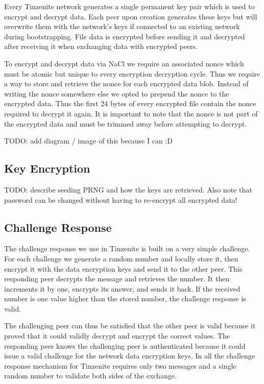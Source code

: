 Every Tinzenite network generates a single permanent key pair which is used to encrypt and decrypt data.
Each peer upon creation generates these keys but will overwrite them with the network's keys if connected to an existing network during bootstrapping.
File data is encrypted before sending it and decrypted after receiving it when exchanging data with encrypted peers.

To encrypt and decrypt data via NaCl we require an associated nonce which must be atomic but unique to every encryption decryption cycle.
Thus we require a way to store and retrieve the nonce for each encrypted data blob.
Instead of writing the nonce somewhere else we opted to prepend the nonce to the encrypted data. %
Thus the first 24 bytes of every encrypted file contain the nonce required to decrypt it again.
It is important to note that the nonce is not part of the encrypted data and must be trimmed away before attempting to decrypt.

TODO: add diagram / image of this because I can :D

\subsection{Key Encryption}
\label{sub:Key Encryption}

TODO: describe seeding PRNG and how the keys are retrieved.
Also note that password can be changed without having to re-encrypt all encrypted data!

\subsection{Challenge Response}
\label{sub:Challenge Response}

The challenge response we use in Tinzenite is built on a very simple challenge.
For each challenge we generate a random number and locally store it, then encrypt it with the data encryption keys and send it to the other peer.
This responding peer decrypts the message and retrieves the number.
It then increments it by one, encrypts its answer, and sends it back.
If the received number is one value higher than the stored number, the challenge response is valid.

The challenging peer can thus be satisfied that the other peer is valid because it proved that it could validly decrypt and encrypt the correct values.
The responding peer knows the challenging peer is authenticated because it could issue a valid challenge for the network data encryption keys.
In all the challenge response mechanism for Tinzenite requires only two messages and a single random number to validate both sides of the exchange.
